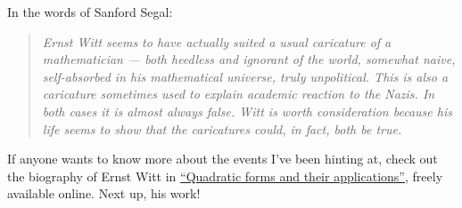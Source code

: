 In the words of Sanford Segal:
\begin{quote}
  \textsl{Ernst Witt seems to have actually suited a usual caricature of a mathematician --- both heedless and ignorant of the world, somewhat naive, self-absorbed in his mathematical universe, truly unpolitical. This is also a caricature sometimes used to explain academic reaction to the Nazis. In both cases it is almost always false. Witt is worth consideration because his life seems to show that the caricatures could, in fact, both be true.}
\end{quote}

If anyone wants to know more about the events I've been hinting at, check out the biography of Ernst Witt in \href{http://www.maths.ed.ac.uk/~aar/books/dublin.pdf}{``Quadratic forms and their applications''}, freely available online.
Next up, his work!
